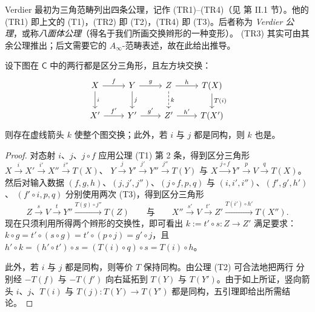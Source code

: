 
Verdier 最初为三角范畴列出四条公理，记作 (TR1)–(TR4)（见 \cite{Ver96}
第 II.1 节）。他的 (TR1) 即上文的 (T1)，(TR2) 即 (T2)，(TR4) 即 (T3)。后者称为
\emph{Verdier 公理}，或称\emph{八面体公理}（得名于我们所画交换辫形的一种变形）。
(TR3) 其实可由其余公理推出；后文需要它的 $A_\infty$-范畴表述，故在此给出推导。

\begin{Lem}\label{lem:3.3}
设下图在 $\mathsf C$ 中的两行都是区分三角形，且左方块交换：
\[
  \begin{tikzcd}
    X \arrow[r, "{f}"] \arrow[d, "{i}"] & Y \arrow[r, "{g}"] \arrow[d, "{j}"]
      & Z \arrow[r, "{h}"] \arrow[d, dashed, "{k}"] & T(X) \arrow[d, "{T(i)}"] \\
    X' \arrow[r, "{f'}"] & Y' \arrow[r, "{g'}"] & Z' \arrow[r, "{h'}"] & T(X')
  \end{tikzcd}
\]
则存在虚线箭头 $k$ 使整个图交换；此外，若 $i$ 与 $j$ 都是同构，则 $k$ 也是。
\end{Lem}

\begin{proof}
对态射 $i$、$j$、$j\circ f$ 应用公理 (T1) 第 2 条，得到区分三角形
$X\xrightarrow{i}X'\xrightarrow{i'}X''\xrightarrow{i''}T(X)$、
$Y\xrightarrow{j}Y'\xrightarrow{j'}Y''\xrightarrow{j''}T(Y)$ 与
$X\xrightarrow{j\circ f}Y'\xrightarrow{p}V\xrightarrow{q}T(X)$。然后对输入数据
$(f,g,h)$、$(j,j',j'')$、$(j\circ f,p,q)$ 与 $(i,i',i'')$、$(f',g',h')$、
$(f'\circ i,p,q)$ 分别使用两次 (T3)，得到区分三角形
\[
  Z\xrightarrow{s}V\xrightarrow{t}Y''\xrightarrow{T(g)\circ j''}T(Z)
  \qquad\text{与}\qquad
  X''\xrightarrow{s'}V\xrightarrow{t'}Z'\xrightarrow{T(i')\circ h'}T(X'').
\]
现在只须利用所得两个辫形的交换性，即可看出 $k:=t'\circ s:Z\to Z'$ 满足要求：
$k\circ g=t'\circ(s\circ g)=t'\circ(p\circ j)=g'\circ j$，且
$h'\circ k=(h'\circ t')\circ s=(T(i)\circ q)\circ s=T(i)\circ h$。

此外，若 $i$ 与 $j$ 都是同构，则等价 $T$ 保持同构。由公理 (T2) 可合法地把两行
分别经 $-T(f)$ 与 $-T(f')$ 向右延拓到 $T(Y)$ 与 $T(Y')$。由于如上所证，竖向箭头
$i$、$j$、$T(i)$ 与 $T(j):T(Y)\to T(Y')$ 都是同构，五引理即给出所需结论。
\end{proof}

